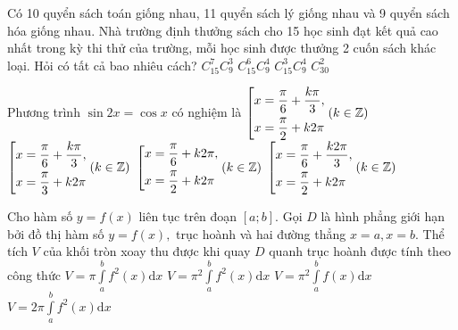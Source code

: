 \begin{ex}%
Có 10 quyển sách toán giống nhau, 11 quyển sách lý giống nhau và 9 quyển sách hóa giống nhau. Nhà trường định thưởng sách cho 15 học sinh đạt kết quả cao nhất trong kỳ thi thử của trường, mỗi học sinh được thưởng 2 cuốn sách khác loại. Hỏi có tất cả bao nhiêu cách?
\choice
{$C^7_{15}C^3_9$}
{\True $C^6_{15}C^4_9$}
{$C^3_{15}C^4_9$}
{$C^2_{30}$}
\end{ex}

\begin{ex}%
Phương trình $\sin2x=\cos x$ có nghiệm là
\choice
{$\left[\begin{aligned}x&=\dfrac{\pi}6+\dfrac{k\pi}3,\\x&=\dfrac{\pi}2+k2\pi\end{aligned}\right. (k\in\mathbb{Z})$}
{$\left[\begin{aligned}x&=\dfrac{\pi}6+\dfrac{k\pi}3,\\x&=\dfrac{\pi}3+k2\pi\end{aligned}\right. (k\in\mathbb{Z})$}
{$\left[\begin{aligned}x&=\dfrac{\pi}6+k2\pi,\\x&=\dfrac{\pi}2+k2\pi\end{aligned}\right. (k\in\mathbb{Z})$}
{\True $\left[\begin{aligned}x&=\dfrac{\pi}6+\dfrac{k2\pi}3,\\x&=\dfrac{\pi}2+k2\pi\end{aligned}\right. (k\in\mathbb{Z})$}
\end{ex}

\begin{ex}%
Cho hàm số $y=f(x)$ liên tục trên đoạn $[a; b]$. Gọi $D$ là hình phẳng giới hạn bởi đồ thị hàm số $y=f(x),$ trục hoành và hai đường thẳng $x=a, x=b.$ Thể tích $V$ của khối tròn xoay thu được khi quay $D$ quanh trục hoành được tính theo công thức
\choice
{\True ${V=\displaystyle{\pi\int\limits_a^bf^2(x)\text{d}x}}$}
{${V=\displaystyle{\pi^2\int\limits_a^bf^2(x)\text{d}x}}$}
{${V=\displaystyle{\pi^2\int\limits_a^bf(x)\text{d}x}}$}
{${V=\displaystyle{2\pi\int\limits_a^bf^2(x)\text{d}x}}$}
\loigiai{}
\end{ex}

